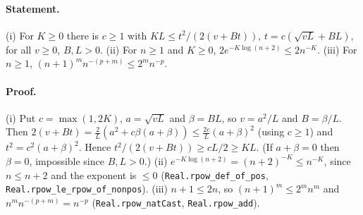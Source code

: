 \paragraph{Statement.} (i) For $K\ge0$ there is $c\ge1$ with
$KL\le t^2/(2(v+Bt))$, $t=c(\sqrt{vL}+BL)$, for all $v\ge0$, $B,L>0$. (ii) For $n\ge1$ and
$K\ge0$, $2e^{-K\log(n+2)}\le2n^{-K}$. (iii) For $n\ge1$, $(n+1)^mn^{-(p+m)}\le2^mn^{-p}$.
\paragraph{Proof.} (i) Put $c=\max(1,2K)$, $a=\sqrt{vL}$ and $\beta=BL$, so $v=a^2/L$ and
$B=\beta/L$. Then $2(v+Bt)=\frac2L(a^2+c\beta(a+\beta))\le\frac{2c}L(a+\beta)^2$ (using $c\ge1$) and
$t^2=c^2(a+\beta)^2$. Hence $t^2/(2(v+Bt))\ge cL/2\ge KL$. (If $a+\beta=0$ then $\beta=0$,
impossible since $B,L>0$.) (ii) $e^{-K\log(n+2)}=(n+2)^{-K}\le n^{-K}$, since $n\le n+2$ and the
exponent is $\le0$ (\texttt{Real.rpow\_def\_of\_pos}, \texttt{Real.rpow\_le\_rpow\_of\_nonpos}).
(iii) $n+1\le2n$, so $(n+1)^m\le2^mn^m$ and $n^mn^{-(p+m)}=n^{-p}$ (\texttt{Real.rpow\_natCast},
\texttt{Real.rpow\_add}).
